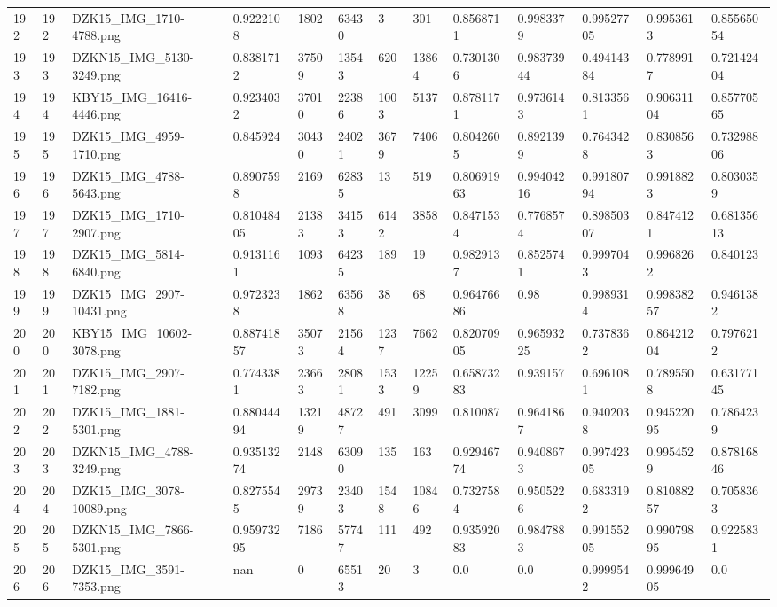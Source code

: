 \documentclass[11pt, a4paper, twoside]{report}
\begin{document}
\begin{longtable}[c]{@{}lllllllllllll@{}}
192 & 192 & DZK15\_IMG\_1710-4788.png & 0.9222108 & 1802 & 63430 & 3 & 301 & 0.8568711 & 0.9983379 & 0.99527705 & 0.9953613 & 0.85565054 \\
193 & 193 & DZKN15\_IMG\_5130-3249.png & 0.8381712 & 37509 & 13543 & 620 & 13864 & 0.7301306 & 0.98373944 & 0.49414384 & 0.7789917 & 0.72142404 \\
194 & 194 & KBY15\_IMG\_16416-4446.png & 0.9234032 & 37010 & 22386 & 1003 & 5137 & 0.8781171 & 0.9736143 & 0.8133561 & 0.90631104 & 0.85770565 \\
195 & 195 & DZK15\_IMG\_4959-1710.png & 0.845924 & 30430 & 24021 & 3679 & 7406 & 0.8042605 & 0.8921399 & 0.7643428 & 0.8308563 & 0.73298806 \\
196 & 196 & DZK15\_IMG\_4788-5643.png & 0.8907598 & 2169 & 62835 & 13 & 519 & 0.80691963 & 0.99404216 & 0.99180794 & 0.9918823 & 0.8030359 \\
197 & 197 & DZK15\_IMG\_1710-2907.png & 0.81048405 & 21383 & 34153 & 6142 & 3858 & 0.8471534 & 0.7768574 & 0.89850307 & 0.8474121 & 0.68135613 \\
198 & 198 & DZK15\_IMG\_5814-6840.png & 0.9131161 & 1093 & 64235 & 189 & 19 & 0.9829137 & 0.8525741 & 0.9997043 & 0.9968262 & 0.840123 \\
199 & 199 & DZK15\_IMG\_2907-10431.png & 0.9723238 & 1862 & 63568 & 38 & 68 & 0.96476686 & 0.98 & 0.9989314 & 0.99838257 & 0.9461382 \\
200 & 200 & KBY15\_IMG\_10602-3078.png & 0.88741857 & 35073 & 21564 & 1237 & 7662 & 0.82070905 & 0.96593225 & 0.7378362 & 0.86421204 & 0.7976212 \\
201 & 201 & DZK15\_IMG\_2907-7182.png & 0.7743381 & 23663 & 28081 & 1533 & 12259 & 0.65873283 & 0.939157 & 0.6961081 & 0.7895508 & 0.63177145 \\
202 & 202 & DZK15\_IMG\_1881-5301.png & 0.88044494 & 13219 & 48727 & 491 & 3099 & 0.810087 & 0.9641867 & 0.9402038 & 0.94522095 & 0.7864239 \\
203 & 203 & DZKN15\_IMG\_4788-3249.png & 0.93513274 & 2148 & 63090 & 135 & 163 & 0.92946774 & 0.9408673 & 0.99742305 & 0.9954529 & 0.87816846 \\
204 & 204 & DZK15\_IMG\_3078-10089.png & 0.8275545 & 29739 & 23403 & 1548 & 10846 & 0.7327584 & 0.9505226 & 0.6833192 & 0.81088257 & 0.7058363 \\
205 & 205 & DZKN15\_IMG\_7866-5301.png & 0.95973295 & 7186 & 57747 & 111 & 492 & 0.93592083 & 0.9847883 & 0.99155205 & 0.99079895 & 0.9225831 \\
206 & 206 & DZK15\_IMG\_3591-7353.png & nan & 0 & 65513 & 20 & 3 & 0.0 & 0.0 & 0.9999542 & 0.99964905 & 0.0 \\

\end{longtable}
\end{document}
